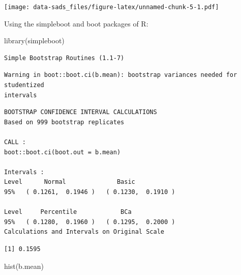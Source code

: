 \documentclass[
  letterpaper,
]{book}
\newenvironment{Shaded}{\begin{snugshade}}{\end{snugshade}}
\newcommand{\DecValTok}[1]{\textcolor[rgb]{0.68,0.00,0.00}{#1}}
\newcommand{\FunctionTok}[1]{\textcolor[rgb]{0.28,0.35,0.67}{#1}}
\newcommand{\NormalTok}[1]{\textcolor[rgb]{0.00,0.23,0.31}{#1}}
\newcommand{\OtherTok}[1]{\textcolor[rgb]{0.00,0.23,0.31}{#1}}
\newcommand{\SpecialCharTok}[1]{\textcolor[rgb]{0.37,0.37,0.37}{#1}}
\begin{document}
\texttt{[image: data-sads\_files/figure-latex/unnamed-chunk-5-1.pdf]}

Using the simpleboot and boot packages of R:

\begin{Shaded}
\begin{Highlighting}[]
\FunctionTok{library}\NormalTok{(simpleboot)}
\end{Highlighting}
\end{Shaded}

\begin{verbatim}
Simple Bootstrap Routines (1.1-7)
\end{verbatim}

\begin{Shaded}
\end{Shaded}

\begin{verbatim}
Warning in boot::boot.ci(b.mean): bootstrap variances needed for studentized
intervals
\end{verbatim}

\begin{verbatim}
BOOTSTRAP CONFIDENCE INTERVAL CALCULATIONS
Based on 999 bootstrap replicates

CALL : 
boot::boot.ci(boot.out = b.mean)

Intervals : 
Level      Normal              Basic         
95%   ( 0.1261,  0.1946 )   ( 0.1230,  0.1910 )  

Level     Percentile            BCa          
95%   ( 0.1280,  0.1960 )   ( 0.1295,  0.2000 )  
Calculations and Intervals on Original Scale
\end{verbatim}

\begin{Shaded}
\end{Shaded}

\begin{verbatim}
[1] 0.1595
\end{verbatim}

\begin{Shaded}
\begin{Highlighting}[]
\FunctionTok{hist}\NormalTok{(b.mean)}
\end{Highlighting}
\end{Shaded}
\end{document}
